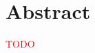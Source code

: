 \documentclass[]{subfiles}
\begin{document}
\section*{Abstract}
    \textcolor{red}{TODO}
\end{document}
